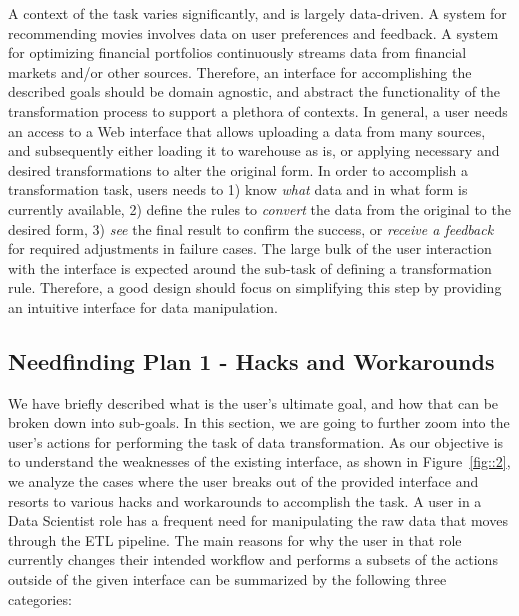 \documentclass[12pt,letterpaper]{article}
\begin{document}
A context of the task varies significantly, and is largely data-driven. A system for recommending movies involves data on user preferences and feedback. A system for optimizing financial portfolios continuously streams data from financial markets and/or other sources. Therefore, an interface for accomplishing the described goals should be domain agnostic, and abstract the functionality of the transformation process to support a plethora of contexts. In general, a user needs an access to a Web interface that allows uploading a data from many sources, and subsequently either loading it to warehouse as is, or applying necessary and desired transformations to alter the original form. In order to accomplish a transformation task, users needs to 1) know \textit{what} data and in what form is currently available, 2) define the rules to \textit{convert} the data from the original to the desired form, 3) \textit{see} the final result to confirm the success, or \textit{receive a feedback} for required adjustments in failure cases. The large bulk of the user interaction with the interface is expected around the sub-task of defining a transformation rule. Therefore, a good design should focus on simplifying this step by providing an intuitive interface for data manipulation.


\subsection*{Needfinding Plan 1 - Hacks and Workarounds}
We have briefly described what is the user's ultimate goal, and how that can be broken down into sub-goals. In this section, we are going to further zoom into the user's actions for performing the task of data transformation. As our objective is to understand the weaknesses of the existing interface, as shown in Figure~\ref{fig::2}, we analyze the cases where the user breaks out of the provided interface and resorts to various hacks and workarounds to accomplish the task. A user in a Data Scientist role has a frequent need for manipulating the raw data that moves through the ETL pipeline. The main reasons for why the user in that role currently changes their intended workflow and performs a subsets of the actions outside of the given interface can be summarized by the following three categories: 
\end{document}
